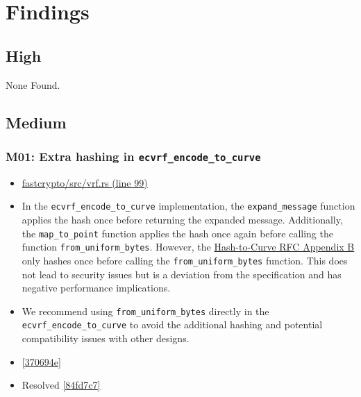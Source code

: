 \section{Findings}
\subsection{High}
    None Found.
\subsection{Medium}

\subsubsection*{M01: Extra hashing in \lstinline{ecvrf_encode_to_curve}}
\begin{itemize}[align=left]
    \item[\textbf{Affected Code:}] \href{https://github.com/MystenLabs/fastcrypto/blob/963205c6d0538fe548b8b10037cf87a53af6f424/fastcrypto/src/vrf.rs#L99}{fastcrypto/src/vrf.rs (line 99)}
    \item[\textbf{Summary:}] In the \lstinline{ecvrf_encode_to_curve} implementation, the \lstinline{expand_message} function applies the hash once before returning the expanded message. Additionally, the \lstinline{map_to_point} function applies the hash once again before calling the function \lstinline{from_uniform_bytes}. However, the \href{https://datatracker.ietf.org/doc/html/draft-irtf-cfrg-hash-to-curve-16#name-hashing-to-ristretto255}{Hash-to-Curve RFC Appendix B} only hashes once before calling the \lstinline{from_uniform_bytes} function. This does not lead to security issues but is a deviation from the specification and has negative performance implications.
    \item[\textbf{Suggestion:}] We recommend using \lstinline{from_uniform_bytes} directly in the \lstinline{ecvrf_encode_to_curve} to avoid the additional hashing and potential compatibility issues with other designs.
    \item[\textbf{Suggested Fix:}] \href{https://github.com/MystenLabs/fastcrypto/pull/543/commits/370694eeffed74a57c816758d472640e4011ae7e}{[370694e]}
    \item[\textbf{Status:}] Resolved \href{https://github.com/MystenLabs/fastcrypto/commit/84fd7c7428c5f59185aecc56a2e0a006e8e07de1}{[84fd7c7]}
\end{itemize}

